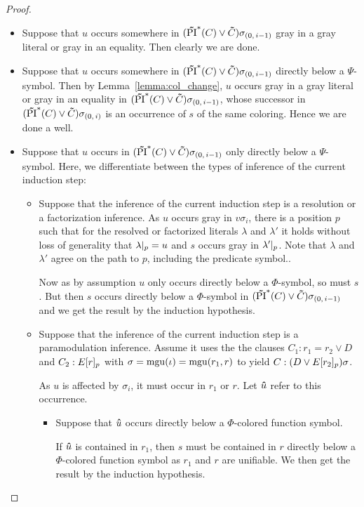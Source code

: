 \begin{proof}
\begin{itemize}
			\begin{itemize}
				\item Suppose that $u$ occurs somewhere in $(\bm\tilde{\operatorname{PI}}^{*}(C)\lor \bm\tilde{C})\sigma_{(0,\,i-1)}$ gray in a gray literal or gray in an equality. Then clearly we are done.
				\item Suppose that $u$ occurs somewhere in $(\bm\tilde{\operatorname{PI}}^{*}(C)\lor \bm\tilde{C})\sigma_{(0,\,i-1)}$ directly below a $\Psi$-symbol.
					Then by Lemma~\ref{lemma:col_change}, $u$ occurs gray in a gray literal or gray in an equality in $(\bm\tilde{\operatorname{PI}}^{*}(C)\lor \bm\tilde{C})\sigma_{(0,\,i-1)}$, whose successor in $(\bm\tilde{\operatorname{PI}}^{*}(C)\lor \bm\tilde{C})\sigma_{(0,\,i)}$ is an occurrence of $s$ of the same coloring. Hence we are done a well.
				\item Suppose that $u$ occurs in $(\bm\tilde{\operatorname{PI}}^{*}(C)\lor \bm\tilde{C})\sigma_{(0,\,i-1)}$ only directly below a $\Psi$-symbol.
					Here, we differentiate between the types of inference of the current induction step:

					\begin{itemize}
						\item
							Suppose that the inference of the current induction step is a resolution or a factorization inference.
							As $u$ occurs gray in $v\sigma_i$, there is a position $p$ such that for the resolved or factorized literals $\lambda$ and $\lambda'$ it holds without loss of generality that $\lambda|_{p} = u$ and $s$ occurs gray in $\lambda'|_{p}$.
							Note that $\lambda$ and $\lambda'$ agree on the path to $p$, including the predicate symbol..

							Now as by assumption $u$ only occurs directly below a $\Phi$-symbol, so must $s$.
							But then $s$ occurs directly below a $\Phi$-symbol in $(\bm\tilde{\operatorname{PI}}^{*}(C)\lor \bm\tilde{C})\sigma_{(0,\,i-1)}$ and we get the result by the induction hypothesis.

						\item
							Suppose that the inference of the current induction step is a paramodulation inference.
							Assume it uses the the clauses $C_1: r_1=r_2 \lor D$ and $C_2: E{[r]_{p}}$ with $\sigma=\operatorname{mgu}(\iota)=\operatorname{mgu}(r_1, r)$ to yield $C: (D\lor E{[r_2]_{p}})\sigma$.

							As $u$ is affected by $\sigma_i$, it must occur in $r_1$ or $r$. Let $\bm\hat u$ refer to this occurrence.

							\begin{itemize}
								\item
									Suppose that $\bm\hat u$ occurs directly below a $\Phi$-colored function symbol. 

									If $\bm\hat u$ is contained in $r_1$, then $s$ must be contained in $r$ directly below a $\Phi$-colored function symbol as $r_1$ and $r$ are unifiable. We then get the result by the induction hypothesis.


\end{itemize}
\end{itemize}
\end{itemize}
\end{itemize}
\end{proof}
